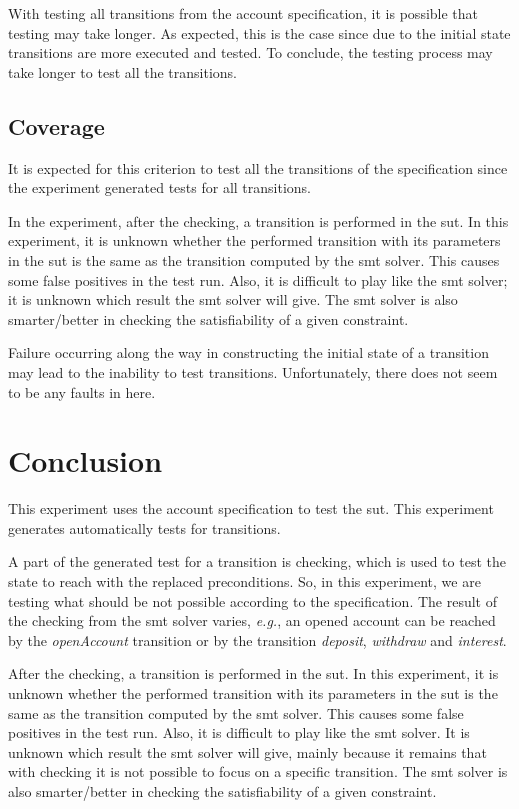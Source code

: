 With testing all transitions from the account specification, it is possible that
testing may take longer. As expected, this is the case since due to the initial
state transitions are more executed and tested. To conclude, the testing process
may take longer to test all the transitions.

\subsection{Coverage}
It is expected for this criterion to test all the transitions of the
specification since the experiment generated tests for all transitions.

In the experiment, after the checking, a transition
is performed in the \gls{sut}. In this experiment, it is unknown whether the
performed transition with its parameters in the \gls{sut} is the same as the
transition computed by the \gls{smt} solver. This causes some false positives in the
test run. Also, it is difficult to play like the \gls{smt} solver; it is unknown which
result the \gls{smt} solver will give. The \gls{smt} solver is also smarter/better in checking
the satisfiability of a given constraint.

Failure occurring along the way in constructing the initial state of a transition
may lead to the inability to test transitions. Unfortunately, there does not
seem to be any faults in here.

\section{Conclusion}
This experiment uses the account specification to test the \gls{sut}.
This experiment generates automatically tests for transitions.

A part of
the generated test for a transition is checking, which is used to test the state to
reach with the replaced preconditions. So, in this experiment, we are
testing what should be not possible according to the specification. The result
of the checking from the \gls{smt} solver varies, \textit{e.g.}, an opened account can be
reached by the \textit{openAccount} transition or by the transition
\textit{deposit}, \textit{withdraw} and \textit{interest}.

After the checking, a transition
is performed in the \gls{sut}. In this experiment, it is unknown whether the
performed transition with its parameters in the \gls{sut} is the same as the
transition computed by the \gls{smt} solver. This causes some false positives in
the test run. Also, it is difficult to play like the \gls{smt} solver. It is
unknown which result the \gls{smt} solver will give, mainly because it remains
that with checking it is not possible to focus on a specific transition. The
\gls{smt} solver is also smarter/better in checking the satisfiability of a
given constraint.

